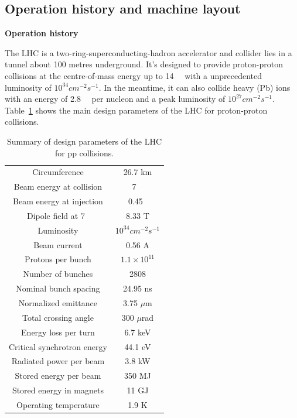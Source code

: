 \subsection{Operation history and machine layout}

\textbf{Operation history}

The LHC \cite{Bruning:2004ej, Buning:2004wk, Benedikt:2004wm, Evans_2008} 
is a two-ring-superconducting-hadron accelerator and collider lies in a tunnel about 100 metres underground.
It's designed to provide proton-proton collisions at the centre-of-mass energy up to 14~\tev~
with a unprecedented luminosity of $10^{34} cm^{-2} s^{-1}$.
In the meantime, it can also collide heavy (Pb) ions with an energy of 2.8~\tev~ per nucleon and a peak luminosity of $10^{27} cm^{-2} s^{-1}$.
Table~\ref{tab:LHC_parameters} shows the main design parameters of the LHC for proton-proton collisions.
\begin{table}[htbp]
  \centering
  \caption{Summary of design parameters of the LHC for pp collisions.}
  \label{tab:LHC_parameters}
  \begin{tabular}{cc}
    \hline
    Circumference	& 26.7 km\\
    Beam energy at collision	& 7 ~\tev\\
    Beam energy at injection	& 0.45~\tev \\
    Dipole field at 7~\tev	& 8.33 T \\
    Luminosity		& $10^{34} cm^{-2} s^{-1}$ \\
    Beam current	& 0.56 A \\
    Protons per bunch	& $1.1 \times 10^{11}$ \\
    Number of bunches	& 2808 \\
    Nominal bunch spacing	& 24.95 ns \\
    Normalized emittance	& 3.75 $\mu$m \\
    Total crossing angle	& 300 $\mu$rad \\
    Energy loss per turn	& 6.7 keV \\
    Critical synchrotron energy	& 44.1 eV \\
    Radiated power per beam	& 3.8 kW \\
    Stored energy per beam	& 350 MJ \\
    Stored energy in magnets	& 11 GJ \\
    Operating temperature	& 1.9 K \\
    \hline
  \end{tabular}
\end{table}

